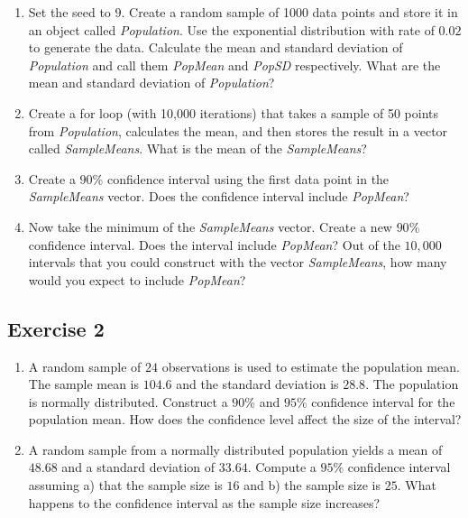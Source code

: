 \documentclass[
  letterpaper,
  DIV=11,
  numbers=noendperiod]{scrreprt}
\begin{document}
\begin{enumerate}
\def\labelenumi{\arabic{enumi}.}
\item
  Set the seed to \(9\). Create a random sample of 1000 data points and
  store it in an object called \emph{Population}. Use the exponential
  distribution with rate of \(0.02\) to generate the data. Calculate the
  mean and standard deviation of \emph{Population} and call them
  \emph{PopMean} and \emph{PopSD} respectively. What are the mean and
  standard deviation of \emph{Population}?
\item
  Create a for loop (with 10,000 iterations) that takes a sample of 50
  points from \emph{Population}, calculates the mean, and then stores
  the result in a vector called \emph{SampleMeans}. What is the mean of
  the \emph{SampleMeans}?
\item
  Create a \(90\)\% confidence interval using the first data point in
  the \emph{SampleMeans} vector. Does the confidence interval include
  \emph{PopMean}?
\item
  Now take the minimum of the \emph{SampleMeans} vector. Create a new
  \(90\)\% confidence interval. Does the interval include
  \emph{PopMean}? Out of the \(10,000\) intervals that you could
  construct with the vector \emph{SampleMeans}, how many would you
  expect to include \emph{PopMean}?
\end{enumerate}

\hypertarget{exercise-2-22}{%
\subsection*{Exercise 2}\label{exercise-2-22}}

\begin{enumerate}
\def\labelenumi{\arabic{enumi}.}
\item
  A random sample of \(24\) observations is used to estimate the
  population mean. The sample mean is \(104.6\) and the standard
  deviation is \(28.8\). The population is normally distributed.
  Construct a \(90\)\% and \(95\)\% confidence interval for the
  population mean. How does the confidence level affect the size of the
  interval?
\item
  A random sample from a normally distributed population yields a mean
  of \(48.68\) and a standard deviation of \(33.64\). Compute a \(95\)\%
  confidence interval assuming a) that the sample size is \(16\) and b)
  the sample size is \(25\). What happens to the confidence interval as
  the sample size increases?
\end{enumerate}
\end{document}
